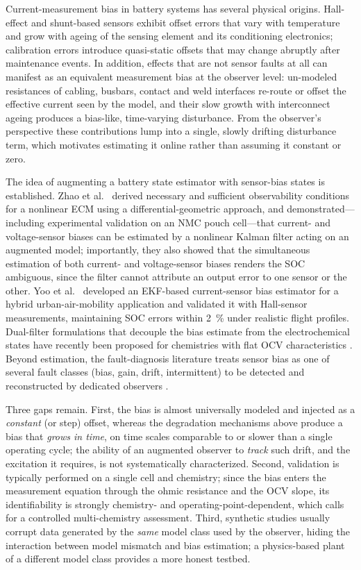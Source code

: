 \documentclass[11pt,a4paper]{article}
\begin{document}
Current-measurement bias in battery systems has several physical origins.
Hall-effect and shunt-based sensors exhibit offset errors that vary with
temperature and grow with ageing of the sensing element and its conditioning
electronics; calibration errors introduce quasi-static offsets that may
change abruptly after maintenance events. In addition, effects that are not
sensor faults at all can manifest as an equivalent measurement bias at the
observer level: un-modeled resistances of cabling, busbars, contact and
weld interfaces re-route or offset the effective current seen by the model,
and their slow growth with interconnect ageing produces a bias-like,
time-varying disturbance. From the observer's perspective these
contributions lump into a single, slowly drifting disturbance term, which
motivates estimating it online rather than assuming it constant or zero.

The idea of augmenting a battery state estimator with sensor-bias states is
established. Zhao et al.\ \citep{zhao2017observability} derived necessary
and sufficient observability conditions for a nonlinear ECM using a
differential-geometric approach, and demonstrated---including experimental
validation on an NMC pouch cell---that current- and voltage-sensor biases
can be estimated by a nonlinear Kalman filter acting on an augmented model;
importantly, they also showed that the simultaneous estimation of both
current- and voltage-sensor biases renders the SOC ambiguous, since the
filter cannot attribute an output error to one sensor or the other. Yoo et
al.\ \citep{yoo2023uam} developed an EKF-based current-sensor bias
estimator for a hybrid urban-air-mobility application and validated it with
Hall-sensor measurements, maintaining SOC errors within \SI{2}{\percent}
under realistic flight profiles. Dual-filter formulations that decouple the
bias estimate from the electrochemical states have recently been proposed
for chemistries with flat OCV characteristics \citep{guo2025rbc}. Beyond
estimation, the fault-diagnosis literature treats sensor bias as one of
several fault classes (bias, gain, drift, intermittent) to be detected and
reconstructed by dedicated observers \citep{lan2023sensor}.

Three gaps remain. First, the bias is almost universally modeled and
injected as a \emph{constant} (or step) offset, whereas the degradation
mechanisms above produce a bias that \emph{grows in time}, on time scales
comparable to or slower than a single operating cycle; the ability of an
augmented observer to \emph{track} such drift, and the excitation it
requires, is not systematically characterized. Second, validation is
typically performed on a single cell and chemistry; since the bias enters
the measurement equation through the ohmic resistance and the OCV slope,
its identifiability is strongly chemistry- and operating-point-dependent,
which calls for a controlled multi-chemistry assessment. Third, synthetic
studies usually corrupt data generated by the \emph{same} model class used
by the observer, hiding the interaction between model mismatch and bias
estimation; a physics-based plant of a different model class provides a
more honest testbed.
\end{document}
